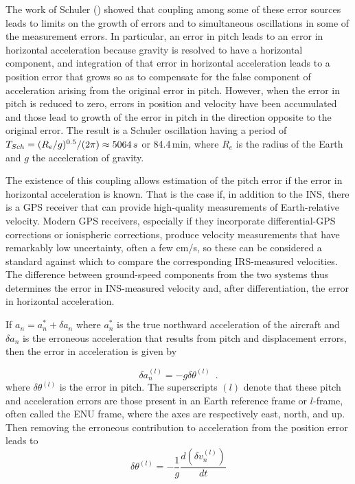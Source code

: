 \documentclass[english,british,amt,bookmarks=false,unicode=true]{copernicus}\usepackage[]{graphicx}\usepackage[]{color}
\begin{document}
The work of Schuler (\citet{Schuler1923}) showed that coupling among
some of these error sources leads to limits on the growth of errors
and to simultaneous oscillations in some of the measurement errors.
In particular, an error in pitch leads to an error in horizontal acceleration
because gravity is resolved to have a horizontal component, and integration
of that error in horizontal acceleration leads to a position error
that grows so as to compensate for the false component of acceleration
arising from the original error in pitch. However, when the error
in pitch is reduced to zero, errors in position and velocity have
been accumulated and those lead to growth of the error in pitch in
the direction opposite to the original error. The result is a Schuler
oscillation having a period of $T_{Sch}=(R_{e}/g)^{0.5}/(2\pi)\approx5064\thinspace s$
or 84.4\,min, where $R_{e}$ is the radius of the Earth and $g$
the acceleration of gravity. 

The existence of this coupling allows estimation of the pitch error
if the error in horizontal acceleration is known. That is the case
if, in addition to the INS, there is a GPS receiver that can provide
high-quality measurements of Earth-relative velocity. Modern GPS receivers,
especially if they incorporate differential-GPS corrections or ionispheric
corrections, produce velocity measurements that have remarkably low
uncertainty, often a few cm/s, so these can be considered a standard
against which to compare the corresponding IRS-measured velocities.
The difference between ground-speed components from the two systems
thus determines the error in INS-measured velocity and, after differentiation,
the error in horizontal acceleration.



If $a_{n}=a_{n}^{*}+\delta a_{n}$ where $a_{n}^{*}$ is the true
northward acceleration of the aircraft and $\delta a_{n}$ is the
erroneous acceleration that results from pitch and displacement errors,
then the error in acceleration is given by

\begin{equation}
\delta a_{n}^{(l)}=-g\delta\theta^{(l)}\,\,\,.\label{eq:delta-an}
\end{equation}
where  $\delta\theta^{(l)}$ is the error in pitch. The superscripts
$(l)$ denote that these pitch and acceleration errors are those present
in an Earth reference frame or $l$-frame, often called the ENU frame,
where the axes are respectively east, north, and up. Then removing
the erroneous contribution to acceleration from the position error
leads to\\
\begin{equation}
\delta\theta^{(l)}=-\frac{1}{g}\frac{d(\delta v_{n}^{(l)})}{dt}\label{eq:full-delta-pitch}
\end{equation}
\end{document}

